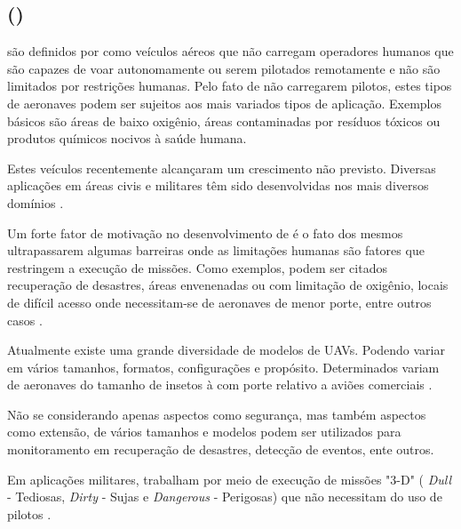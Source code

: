 \subsection{\uavs (\vants) }

\vants são definidos por \cite{uav_roadmap2005} como veículos aéreos que não carregam operadores humanos que são capazes de voar autonomamente ou serem pilotados remotamente e não são limitados por restrições humanas. Pelo fato de não carregarem pilotos, estes tipos de aeronaves podem ser sujeitos aos mais variados tipos de aplicação.
Exemplos básicos são áreas de baixo oxigênio, áreas contaminadas por resíduos tóxicos ou produtos químicos nocivos à saúde humana.

Estes veículos recentemente alcançaram um crescimento não previsto. Diversas aplicações em áreas civis e militares têm sido desenvolvidas nos mais diversos domínios \cite{Valavanis2007}.


Um forte fator de motivação no desenvolvimento de \vants é o fato dos mesmos ultrapassarem algumas barreiras onde as limitações humanas são fatores que restringem a execução de missões. Como exemplos, podem ser citados recuperação de desastres, áreas envenenadas ou com limitação de oxigênio, locais de difícil acesso onde necessitam-se de aeronaves de menor porte, entre outros casos \cite{uas_2009}. 

Atualmente existe uma grande diversidade de modelos de UAVs. Podendo variar em vários tamanhos, formatos, configurações e propósito.
Determinados \vants variam de aeronaves do tamanho de insetos à \vants com porte relativo a aviões comerciais \cite{Bone2003}.

Não se considerando apenas aspectos como segurança, mas também aspectos como extensão, \vants de vários tamanhos e modelos podem ser utilizados para monitoramento em recuperação de desastres, detecção de eventos, ente outros. 

Em aplicações militares, \vants trabalham por meio de execução de missões "3-D" ( \emph{Dull} - Tediosas, \emph{Dirty} - Sujas e \emph{Dangerous} - Perigosas) que não necessitam do uso de pilotos \cite{Bone2003}.


